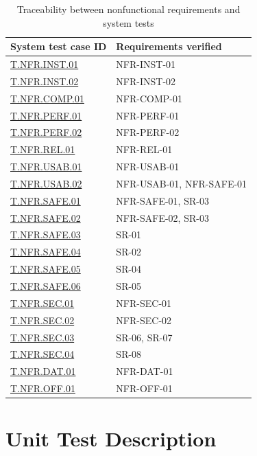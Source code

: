 \documentclass[12pt, titlepage]{article}
\begin{document}
\begin{table}[H]
\centering
\caption{Traceability between nonfunctional requirements and system tests}
\label{tab:nfr-traceability}
\begin{tabularx}{\textwidth}{p{}X}
\toprule
\textbf{System test case ID} & \textbf{Requirements verified}\\
\midrule
\hyperlink{test-nfr-ins01}{T.NFR.INST.01} & NFR-INST-01\\
\hyperlink{test-nfr-ins02}{T.NFR.INST.02} & NFR-INST-02\\
\hyperlink{test-nfr-comp-01}{T.NFR.COMP.01} & NFR-COMP-01\\
\hyperlink{test-nfr-perf-01}{T.NFR.PERF.01} & NFR-PERF-01\\
\hyperlink{test-nfr-perf-02}{T.NFR.PERF.02} & NFR-PERF-02\\
\hyperlink{test-nfr-rel-01}{T.NFR.REL.01} & NFR-REL-01\\
\hyperlink{test-nfr-usab-01}{T.NFR.USAB.01} & NFR-USAB-01\\
\hyperlink{test-nfr-usab-02}{T.NFR.USAB.02} & NFR-USAB-01, NFR-SAFE-01\\
\hyperlink{test-nfr-safe-01}{T.NFR.SAFE.01} & NFR-SAFE-01, SR-03\\
\hyperlink{test-nfr-safe-02}{T.NFR.SAFE.02} & NFR-SAFE-02, SR-03\\
\hyperlink{test-nfr-safe-03}{T.NFR.SAFE.03} & SR-01\\
\hyperlink{test-nfr-safe-04}{T.NFR.SAFE.04} & SR-02\\
\hyperlink{test-nfr-safe-05}{T.NFR.SAFE.05} & SR-04\\
\hyperlink{test-nfr-safe-06}{T.NFR.SAFE.06} & SR-05\\
\hyperlink{test-nfr-sec-01}{T.NFR.SEC.01} & NFR-SEC-01\\
\hyperlink{test-nfr-sec-02}{T.NFR.SEC.02} & NFR-SEC-02\\
\hyperlink{test-nfr-sec-03}{T.NFR.SEC.03} & SR-06, SR-07\\
\hyperlink{test-nfr-sec-04}{T.NFR.SEC.04} & SR-08\\
\hyperlink{test-nfr-da01}{T.NFR.DAT.01} & NFR-DAT-01\\
\hyperlink{test-nfr-off-01}{T.NFR.OFF.01} & NFR-OFF-01\\
\bottomrule
\end{tabularx}
\end{table}

\section{Unit Test Description}
\end{document}

